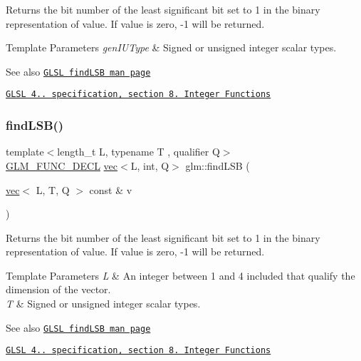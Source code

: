 Returns the bit number of the least significant bit set to 1 in the binary representation of value. If value is zero, -\/1 will be returned.


\begin{DoxyTemplParams}{Template Parameters}
{\em gen\+I\+U\+Type} & Signed or unsigned integer scalar types.\\
\hline
\end{DoxyTemplParams}
\begin{DoxySeeAlso}{See also}
\href{http://www.opengl.org/sdk/docs/manglsl/xhtml/findLSB.xml}{\tt G\+L\+SL find\+L\+SB man page} 

\href{http://www.opengl.org/registry/doc/GLSLangSpec.4.20.8.pdf}{\tt G\+L\+SL 4.. specification, section 8. Integer Functions} 
\end{DoxySeeAlso}
\mbox{\label{group__core__func__integer_ga4454c0331d6369888c28ab677f4810c7}} 
\subsubsection{\texorpdfstring{find\+L\+S\+B()}{findLSB()}\hspace{0.1cm}{\footnotesize\ttfamily [2/2]}}
{\footnotesize\ttfamily template$<$length\+\_\+t L, typename T , qualifier Q$>$ \\
\hyperlink{setup_8hpp_ab2d052de21a70539923e9bcbf6e83a51}{G\+L\+M\+\_\+\+F\+U\+N\+C\+\_\+\+D\+E\+CL} \hyperlink{structglm_1_1vec}{vec}$<$L, int, Q$>$ glm\+::find\+L\+SB (\begin{DoxyParamCaption}\item[{\hyperlink{structglm_1_1vec}{vec}$<$ L, T, Q $>$ const \&}]{v }\end{DoxyParamCaption})}

Returns the bit number of the least significant bit set to 1 in the binary representation of value. If value is zero, -\/1 will be returned.


\begin{DoxyTemplParams}{Template Parameters}
{\em L} & An integer between 1 and 4 included that qualify the dimension of the vector. \\
\hline
{\em T} & Signed or unsigned integer scalar types.\\
\hline
\end{DoxyTemplParams}
\begin{DoxySeeAlso}{See also}
\href{http://www.opengl.org/sdk/docs/manglsl/xhtml/findLSB.xml}{\tt G\+L\+SL find\+L\+SB man page} 

\href{http://www.opengl.org/registry/doc/GLSLangSpec.4.20.8.pdf}{\tt G\+L\+SL 4.. specification, section 8. Integer Functions} 
\end{DoxySeeAlso}
\mbox{\label{group__core__func__integer_ga7e4a794d766861c70bc961630f8ef621}} 
